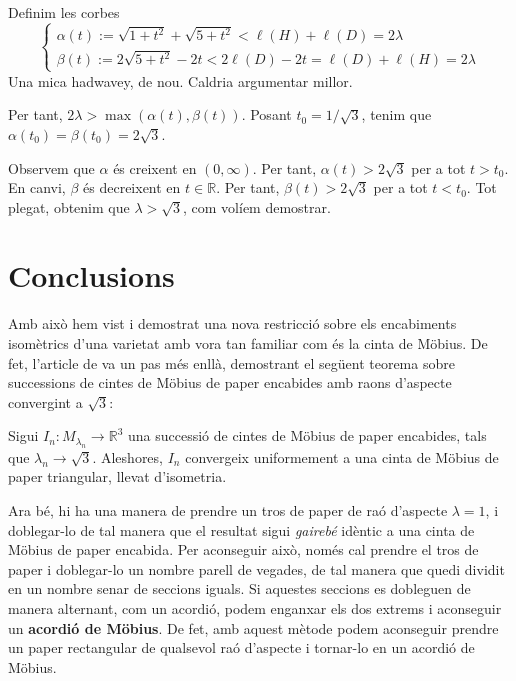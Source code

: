 Definim les corbes
\begin{equation*}
    \begin{cases}
        \alpha(t) := \sqrt{1+t^2} + \sqrt{5+t^2}<\ell(H) + \ell(D) = 2\lambda\\
        \beta(t) := 2\sqrt{5+t^2}-2t < 2\ell(D)-2t = \ell(D) + \ell(H) = 2\lambda
    \end{cases}
\end{equation*}
{\color{red} Una mica hadwavey, de nou. Caldria argumentar millor.}

Per tant, $2\lambda > \max(\alpha(t),\beta(t))$. Posant $t_0 = 1/\sqrt{3}$, tenim que $\alpha(t_0) = \beta(t_0) = 2\sqrt3$.

Observem que $\alpha$ és creixent en $(0,\infty)$. Per tant, $\alpha(t)>2\sqrt3$ per a tot $t>t_0$. En canvi, $\beta$ és decreixent en $t\in\mathbb R$. Per tant, $\beta(t)>2\sqrt3$ per a tot $t<t_0$. Tot plegat, obtenim que $\lambda>\sqrt3$, com volíem demostrar.

\section{Conclusions}
Amb això hem vist i demostrat una nova restricció sobre els encabiments isomètrics d'una varietat amb vora tan familiar com és la cinta de Möbius. De fet, l'article de \cite{schwartz2024} va un pas més enllà, demostrant el següent teorema sobre successions de cintes de Möbius de paper encabides amb raons d'aspecte convergint a $\sqrt{3}$:

\begin{teo}\label{teo:Límit triangular}
    Sigui $I_n:M_{\lambda_n}\to\mathbb R^3$ una successió de cintes de Möbius de paper encabides, tals que $\lambda_n\to\sqrt{3}$. Aleshores, $I_n$ convergeix uniformement a una cinta de Möbius de paper triangular, llevat d'isometria.
\end{teo}

Ara bé, hi ha una manera de prendre un tros de paper de raó d'aspecte $\lambda = 1$, i doblegar-lo de tal manera que el resultat sigui \textit{gairebé} idèntic a una cinta de Möbius de paper encabida. Per aconseguir això, només cal prendre el tros de paper i doblegar-lo un nombre parell de vegades, de tal manera que quedi dividit en un nombre senar de seccions iguals. Si aquestes seccions es dobleguen de manera alternant, com un acordió, podem enganxar els dos extrems i aconseguir un \textbf{acordió de Möbius}. De fet, amb aquest mètode podem aconseguir prendre un paper rectangular de qualsevol raó d'aspecte i tornar-lo en un acordió de Möbius. 

